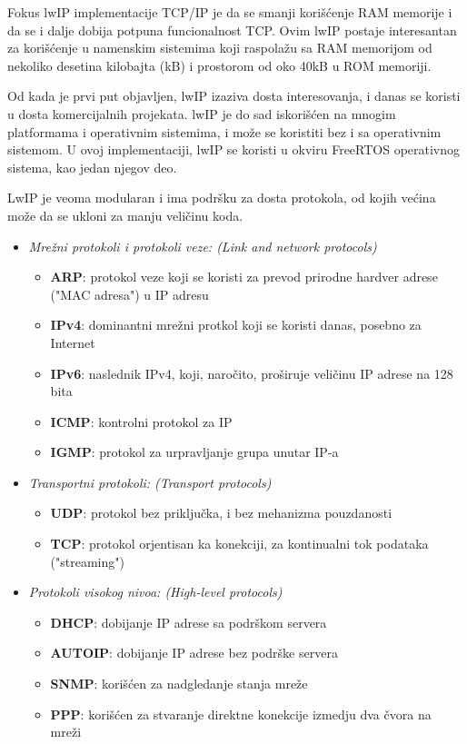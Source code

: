 \documentclass[a4paper,12pt, master]{etf}
\begin{document}
	Fokus lwIP implementacije TCP/IP je da se smanji kori\v{s}\'{c}enje RAM memorije i da se i dalje
	dobija potpuna funcionalnost TCP\@. Ovim lwIP postaje interesantan za kori\v{s}\'{c}enje u namenskim
	sistemima koji raspola\v{z}u sa RAM memorijom od nekoliko desetina kilobajta (kB) i prostorom od
	oko 40kB u ROM memoriji.

	Od kada je prvi put objavljen, lwIP izaziva dosta interesovanja, i danas se koristi u dosta
	komercijalnih projekata\@. lwIP je do sad iskori\v{s}\'{c}en na mnogim platformama i operativnim
	sistemima, i mo\v{z}e se koristiti bez i sa operativnim sistemom. U ovoj implementaciji, lwIP
	se koristi u okviru FreeRTOS operativnog sistema, kao jedan njegov deo.

	LwIP je veoma modularan i ima podr\v{s}ku za dosta protokola, od kojih ve\'{c}ina mo\v{z}e da se
	ukloni za manju veli\v{c}inu koda.
	\begin{itemize}
		\item \textit{Mre\v{z}ni protokoli i protokoli veze: (Link and network protocols)}
		\begin{itemize}
			\item \textbf{ARP}: protokol veze koji se koristi za prevod prirodne hardver adrese
			("MAC adresa") u IP adresu
			\item \textbf{IPv4}: dominantni mre\v{z}ni protkol koji se koristi danas, posebno za
			Internet
			\item \textbf{IPv6}: naslednik IPv4, koji, naro\v{c}ito, pro\v{s}iruje veli\v{c}inu IP adrese
			na 128 bita
			\item \textbf{ICMP}: kontrolni protokol za IP
			\item \textbf{IGMP}: protokol za urpravljanje grupa unutar IP-a
		\end{itemize}
		\item \textit{Transportni protokoli: (Transport protocols)}
			\begin{itemize}
				\item \textbf{UDP}: protokol bez priklju\v{c}ka, i bez mehanizma pouzdanosti
				\item \textbf{TCP}: protokol orjentisan ka konekciji, za kontinualni tok
				podataka ("streaming")
			\end{itemize}
		\item \textit{Protokoli visokog nivoa: (High-level protocols)}
			\begin{itemize}
				\item \textbf{DHCP}: dobijanje IP adrese sa podr\v{s}kom servera
				\item \textbf{AUTOIP}: dobijanje IP adrese bez podr\v{s}ke servera
				\item \textbf{SNMP}: kori\v{s}\'{c}en za nadgledanje stanja mre\v{z}e
				\item \textbf{PPP}: kori\v{s}\'{c}en za stvaranje direktne konekcije izmedju dva \v{c}vora
				na mre\v{z}i
			\end{itemize}
	\end{itemize}
\end{document}
